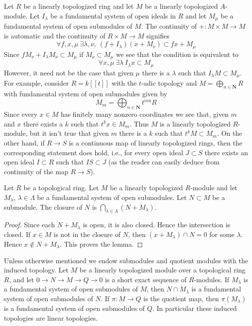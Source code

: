 \begin{example}
\label{example-what-does-it-mean}
Let $R$ be a linearly topologized ring and let $M$ be a linearly
topologized $A$-module. Let $I_\lambda$ be a fundamental system of
open ideals in $R$ and let $M_\mu$ be a fundamental system of
open submodules of $M$. The continuity of $+ : M \times M \to M$
is automatic and the continuity of $R \times M \to M$ signifies
$$
\forall f, x, \mu\ \exists \lambda, \nu,\ (f + I_\lambda)(x + M_\nu)
\subset fx + M_\mu
$$
Since $fM_\nu + I_\lambda M_\nu \subset M_\mu$ if
$M_\nu \subset M_\mu$ we see that the condition is equivalent to
$$
\forall x, \mu\ \exists \lambda\ I_\lambda x \subset M_\mu
$$
However, it need not be the case that given $\mu$ there is a $\lambda$
such that $I_\lambda M \subset M_\mu$. For example, consider
$R = k[[t]]$ with the $t$-adic topology and
$M = \bigoplus_{n \in \mathbf{N}} R$ with fundamental system of
open submodules given by
$$
M_m = \bigoplus\nolimits_{n \in \mathbf{N}} t^{nm}R
$$
Since every $x \in M$ has finitely many nonzero coordinates we see
that, given $m$ and $x$ there exists a $k$ such that $t^k x \in M_m$.
Thus $M$ is a linearly topologized $R$-module, but it isn't true
that given $m$ there is a $k$ such that $t^kM \subset M_m$.
On the other hand, if $R \to S$ is a continuous map of linearly
topologized rings, then the corresponding statement does hold, i.e.,
for every open ideal $J \subset S$ there exists an open ideal
$I \subset R$ such that $IS \subset J$ (as the reader can easily
deduce from continuity of the map $R \to S$).
\end{example}

\begin{lemma}
\label{lemma-closed}
Let $R$ be a topological ring. Let $M$ be a linearly topologized
$R$-module and let $M_\lambda$, $\lambda \in \Lambda$ be a fundamental
system of open submodules. Let $N \subset M$ be a submodule.
The closure of $N$ is $\bigcap_{\lambda \in \Lambda} (N + M_\lambda)$.
\end{lemma}

\begin{proof}
Since each $N + M_\lambda$ is open, it is also closed. Hence the
intersection is closed. If $x \in M$ is not in the closure of $N$,
then $(x + M_\lambda) \cap N = 0$ for some $\lambda$. Hence
$x \not \in N + M_\lambda$. This proves the lemma.
\end{proof}

\noindent
Unless otherwise mentioned we endow submodules and quotient modules
with the induced topology. Let $M$ be a linearly topologized module
over a topological ring $R$, and let $0 \to N \to M \to Q \to 0$
is a short exact sequence of $R$-modules. If $M_\lambda$ is a
fundamental system of open submodules of $M$, then
$N \cap M_\lambda$ is a fundamental system of open submodules of $N$.
If $\pi : M \to Q$ is the quotient map, then $\pi(M_\lambda)$ is a
fundamental system of open submodules of $Q$. In particular these induced
topologies are linear topologies.

